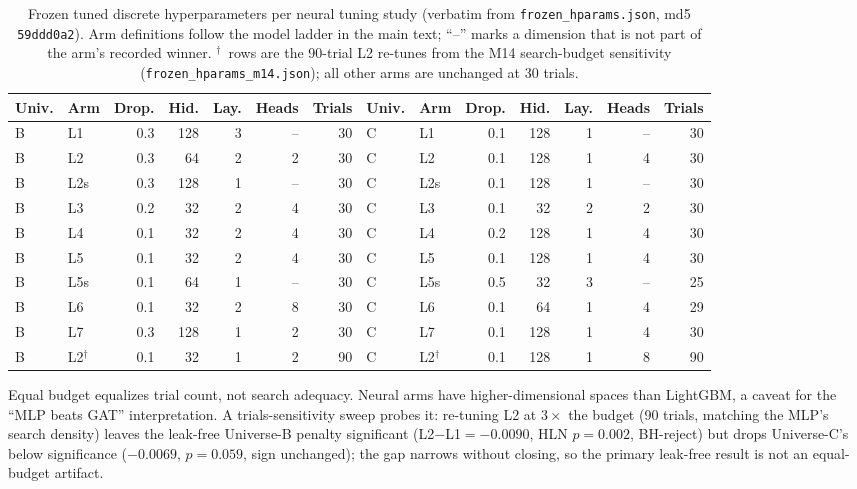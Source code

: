 \documentclass{article}
\begin{document}
\begin{table}[h]
  \centering
  \caption{Frozen tuned discrete hyperparameters per neural tuning study (verbatim from \texttt{frozen\_hparams.json}, md5 \texttt{59ddd0a2}). Arm definitions follow the model ladder in the main text; ``--'' marks a dimension that is not part of the arm's recorded winner. $^{\dagger}$~rows are the 90-trial L2 re-tunes from the M14 search-budget sensitivity (\texttt{frozen\_hparams\_m14.json}); all other arms are unchanged at 30 trials.}
  \label{app:setup:tab:frozen}
  {\small
  \setlength{\tabcolsep}{4pt}
  \begin{tabular}{llrrrrr@{\hspace{2em}}llrrrrr}
    \toprule
    Univ. & Arm & Drop. & Hid. & Lay. & Heads & Trials & Univ. & Arm & Drop. & Hid. & Lay. & Heads & Trials \\
    \midrule
    B & L1  & 0.3 & 128 & 3 & --  & 30 & C & L1  & 0.1 & 128 & 1 & --  & 30 \\
    B & L2  & 0.3 & 64  & 2 & 2   & 30 & C & L2  & 0.1 & 128 & 1 & 4   & 30 \\
    B & L2s & 0.3 & 128 & 1 & --  & 30 & C & L2s & 0.1 & 128 & 1 & --  & 30 \\
    B & L3  & 0.2 & 32  & 2 & 4   & 30 & C & L3  & 0.1 & 32  & 2 & 2   & 30 \\
    B & L4  & 0.1 & 32  & 2 & 4   & 30 & C & L4  & 0.2 & 128 & 1 & 4   & 30 \\
    B & L5  & 0.1 & 32  & 2 & 4   & 30 & C & L5  & 0.1 & 128 & 1 & 4   & 30 \\
    B & L5s & 0.1 & 64  & 1 & --  & 30 & C & L5s & 0.5 & 32  & 3 & --  & 25 \\
    B & L6  & 0.1 & 32  & 2 & 8   & 30 & C & L6  & 0.1 & 64  & 1 & 4   & 29 \\
    B & L7  & 0.3 & 128 & 1 & 2   & 30 & C & L7  & 0.1 & 128 & 1 & 4   & 30 \\
    \midrule
    B & L2$^{\dagger}$ & 0.1 & 32 & 1 & 2 & 90 & C & L2$^{\dagger}$ & 0.1 & 128 & 1 & 8 & 90 \\
    \bottomrule
  \end{tabular}
  }
\end{table}

Equal budget equalizes trial count, not search adequacy. Neural arms have higher-dimensional spaces than LightGBM, a caveat for the ``MLP beats GAT'' interpretation. A trials-sensitivity sweep probes it: re-tuning L2 at $3\times$ the budget (90 trials, matching the MLP's search density) leaves the leak-free Universe-B penalty significant (L2$-$L1${}=-0.0090$, HLN $p=0.002$, BH-reject) but drops Universe-C's below significance ($-0.0069$, $p=0.059$, sign unchanged); the gap narrows without closing, so the primary leak-free result is not an equal-budget artifact.
\end{document}
